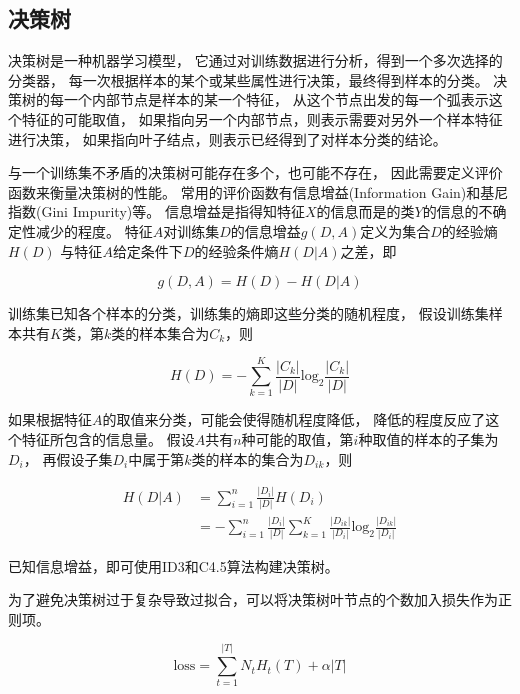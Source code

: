 \documentclass[a4paper, twocolumn]{article}
\begin{document}
\subsection{决策树}

决策树是一种机器学习模型，
它通过对训练数据进行分析，得到一个多次选择的分类器，
每一次根据样本的某个或某些属性进行决策，最终得到样本的分类。
决策树的每一个内部节点是样本的某一个特征，
从这个节点出发的每一个弧表示这个特征的可能取值，
如果指向另一个内部节点，则表示需要对另外一个样本特征进行决策，
如果指向叶子结点，则表示已经得到了对样本分类的结论。

与一个训练集不矛盾的决策树可能存在多个，也可能不存在，
因此需要定义评价函数来衡量决策树的性能。
常用的评价函数有信息增益(Information Gain)和基尼指数(Gini Impurity)等。
信息增益是指得知特征$X$的信息而是的类$Y$的信息的不确定性减少的程度。
特征$A$对训练集$D$的信息增益$g(D, A)$定义为集合$D$的经验熵$H(D)$
与特征$A$给定条件下$D$的经验条件熵$H(D|A)$之差，即

\begin{equation}
    g(D, A) = H(D) - H(D|A)
\end{equation}

训练集已知各个样本的分类，训练集的熵即这些分类的随机程度，
假设训练集样本共有$K$类，第$k$类的样本集合为$C_k$，则

\begin{equation}
    H(D) = -\sum_{k=1}^K\frac{|C_k|}{|D|}\mathrm{log}_2\frac{|C_k|}{|D|}
\end{equation}

如果根据特征$A$的取值来分类，可能会使得随机程度降低，
降低的程度反应了这个特征所包含的信息量。
假设$A$共有$n$种可能的取值，第$i$种取值的样本的子集为$D_i$，
再假设子集$D_i$中属于第$k$类的样本的集合为$D_{ik}$，则

\begin{equation}
    \begin{split}
        H(D|A) &= \sum_{i=1}^n\frac{|D_i|}{|D|}H(D_i) \\
               &= -\sum_{i=1}^n\frac{|D_i|}{|D|}\sum_{k=1}^K\frac{|D_{ik}|}{|D_i|}\mathrm{log}_2\frac{|D_{ik}|}{|D_i|}
    \end{split}
\end{equation}

已知信息增益，即可使用ID3和C4.5算法构建决策树\cite{statistics}。

为了避免决策树过于复杂导致过拟合，可以将决策树叶节点的个数加入损失作为正则项。

\begin{equation}
    \mathrm{loss} = \sum_{t=1}^{|T|}N_tH_t(T)+\alpha|T|
\end{equation}
\end{document}

